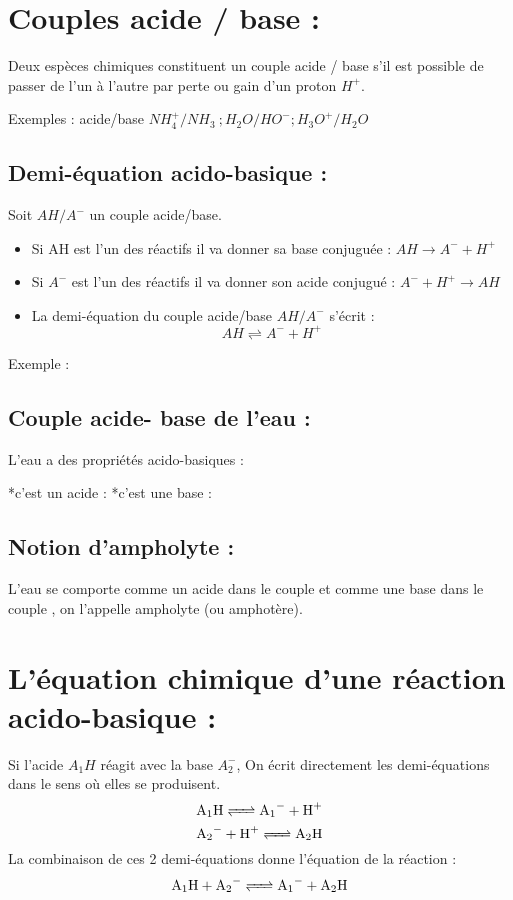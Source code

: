 \documentclass[12pt]{article}
\begin{document}
\section{Couples acide / base :}


Deux espèces chimiques constituent un couple acide / base s’il est possible de passer
de l’un à l’autre par perte ou gain d’un proton $H^+$.

Exemples : acide/base $NH_4^+/NH_3 \ ; H_2O/HO^-  ; H_3O^+/H_2O$

\subsection{Demi-équation acido-basique :}
Soit $AH/A^-$ un couple acide/base.
\begin{itemize}
   \item Si AH est l’un des réactifs il va donner sa base conjuguée : $AH \rightarrow A^- + H^+$
   \item Si $A^-$ est l’un des réactifs il va donner son acide conjugué : $A^- + H^+ \rightarrow AH$
   \item La demi-équation du couple acide/base $AH/A^-$ s’écrit :$$AH \rightleftharpoons A^- + H^+ $$
\end{itemize}
Exemple :  
\subsection{ Couple acide- base de l’eau : }
L’eau a des propriétés acido-basiques :

*c’est un acide :  *c’est une base :
\subsection{Notion d’ampholyte : }
L’eau se comporte comme un acide dans le couple et comme une base dans le couple , on l’appelle ampholyte (ou amphotère).

\section{L’équation chimique d’une réaction acido-basique :}
Si l’acide $A_1H$ réagit avec la base $A_2^-$, On écrit directement les demi-équations dans le sens où elles se produisent.$$\ce{A1H <=> A1- + H+}$$ $$\ce{A2- + H+ <=> A2H}$$
La combinaison de ces 2 demi-équations donne l’équation de la réaction :
$$\ce{A1H + A2- <=> A1- + A2H}$$
\end{document}

